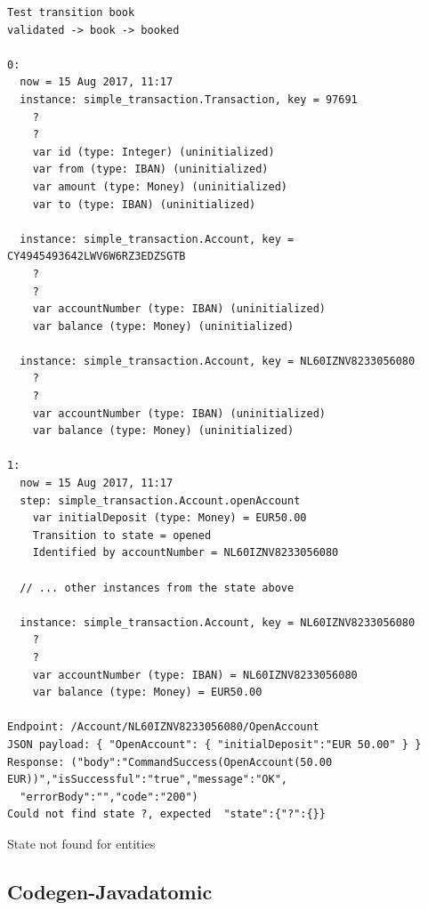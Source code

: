 \begin{sourcecode}[h!]
\begin{lstlisting}[]
Test transition book
validated -> book -> booked

0:
  now = 15 Aug 2017, 11:17
  instance: simple_transaction.Transaction, key = 97691
    ?
    ?
    var id (type: Integer) (uninitialized)
    var from (type: IBAN) (uninitialized)
    var amount (type: Money) (uninitialized)
    var to (type: IBAN) (uninitialized)

  instance: simple_transaction.Account, key = CY4945493642LWV6W6RZ3EDZSGTB
    ?
    ?
    var accountNumber (type: IBAN) (uninitialized)
    var balance (type: Money) (uninitialized)

  instance: simple_transaction.Account, key = NL60IZNV8233056080
    ?
    ?
    var accountNumber (type: IBAN) (uninitialized)
    var balance (type: Money) (uninitialized)

1:
  now = 15 Aug 2017, 11:17
  step: simple_transaction.Account.openAccount
    var initialDeposit (type: Money) = EUR50.00
    Transition to state = opened
    Identified by accountNumber = NL60IZNV8233056080

  // ... other instances from the state above

  instance: simple_transaction.Account, key = NL60IZNV8233056080
    ?
    ?
    var accountNumber (type: IBAN) = NL60IZNV8233056080
    var balance (type: Money) = EUR50.00

Endpoint: /Account/NL60IZNV8233056080/OpenAccount
JSON payload: { "OpenAccount": { "initialDeposit":"EUR 50.00" } }
Response: ("body":"CommandSuccess(OpenAccount(50.00 EUR))","isSuccessful":"true","message":"OK",
  "errorBody":"","code":"200")
Could not find state ?, expected  "state":{"?":{}}
\end{lstlisting}
\caption{State not found for entities}\label{fig:result-not-found-state}
\end{sourcecode}
\FloatBarrier

\subsection{Codegen-Javadatomic}\label{sec:bug-interest-javadatomic}

